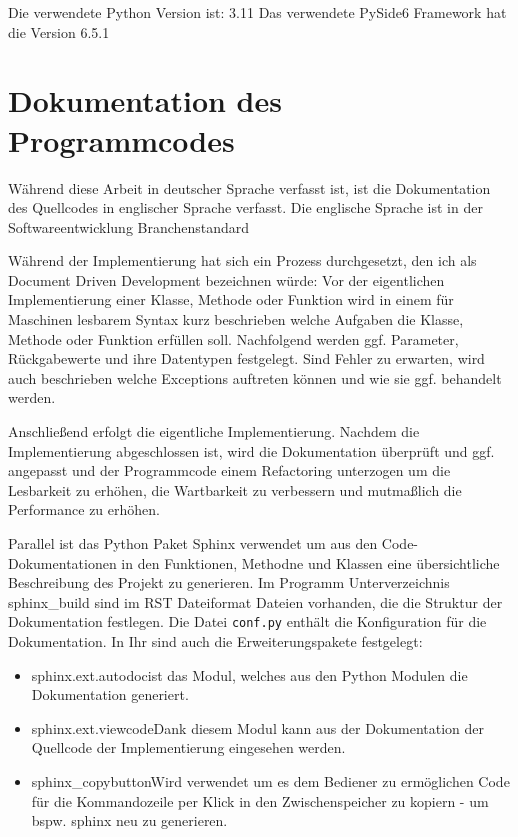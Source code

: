 Die verwendete Python Version ist: 3.11
Das verwendete PySide6 Framework hat die Version 6.5.1

\section{Dokumentation des Programmcodes}

Während diese Arbeit in deutscher Sprache verfasst ist, ist die Dokumentation des Quellcodes in englischer Sprache verfasst. 
Die englische Sprache ist in der Softwareentwicklung Branchenstandard

Während der Implementierung hat sich ein Prozess durchgesetzt, den ich als Document Driven Development bezeichnen würde:
Vor der eigentlichen Implementierung einer Klasse, Methode oder Funktion wird in einem für Maschinen lesbarem Syntax kurz beschrieben 
welche Aufgaben die Klasse, Methode oder Funktion erfüllen soll. Nachfolgend werden ggf. Parameter, Rückgabewerte und ihre Datentypen festgelegt. 
Sind Fehler zu erwarten, wird auch beschrieben welche Exceptions auftreten können und wie sie ggf. behandelt werden. 

Anschließend erfolgt die eigentliche Implementierung. Nachdem die Implementierung abgeschlossen ist, wird die Dokumentation überprüft und ggf. angepasst und
der Programmcode einem Refactoring unterzogen um die Lesbarkeit zu erhöhen, die Wartbarkeit zu verbessern und mutmaßlich die Performance zu erhöhen.

Parallel ist das Python Paket Sphinx verwendet um aus den Code-Dokumentationen in den Funktionen, 
Methodne und Klassen eine übersichtliche Beschreibung des Projekt zu generieren. 
Im Programm Unterverzeichnis \glqq sphinx\_build \grqq sind im RST Dateiformat Dateien vorhanden, 
die die Struktur der Dokumentation festlegen.
Die Datei \verb|conf.py| enthält die Konfiguration für die Dokumentation. In Ihr sind auch die Erweiterungspakete festgelegt: 

\begin{itemize}
    \item \glq sphinx.ext.autodoc\grq ist das Modul, welches aus den Python Modulen die Dokumentation generiert.
    \item \glq sphinx.ext.viewcode\grq Dank diesem Modul kann aus der Dokumentation der Quellcode der Implementierung eingesehen werden.
    \item \glq sphinx\_copybutton\grq Wird verwendet um es dem Bediener zu ermöglichen Code für die Kommandozeile per Klick in den Zwischenspeicher zu kopiern - um bspw. sphinx neu zu generieren.
\end{itemize}


